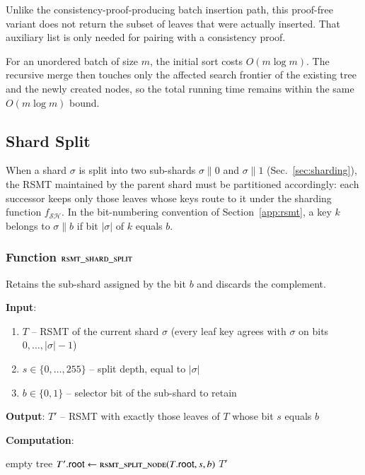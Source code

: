 Unlike the consistency-proof-producing batch insertion path, this proof-free variant does not return the subset of leaves that were actually inserted. That auxiliary list is only needed for pairing with a consistency proof.

For an unordered batch of size $m$, the initial sort costs $O(m \log m)$. The recursive merge then touches only the affected search frontier of the existing tree and the newly created nodes, so the total running time remains within the same $O(m \log m)$ bound.


\subsection{Shard Split}\label{sec:rsmt-shard-split}

When a shard $\sigma$ is split into two sub-shards $\sigma \| 0$ and $\sigma \| 1$ (Sec.~\ref{sec:sharding}), the RSMT maintained by the parent shard must be partitioned accordingly: each successor keeps only those leaves whose keys route to it under the sharding function $f_{\mathcal{SH}}$. In the bit-numbering convention of Section~\ref{app:rsmt}, a key $k$ belongs to $\sigma \| b$ if bit $|\sigma|$ of $k$ equals $b$.

\subsubsection{Function $\textsc{rsmt\_shard\_split}$}\label{sec:rsmt-shard-split-fn}

Retains the sub-shard assigned by the bit $b$ and discards the complement.

\textbf{Input}:
\begin{enumerate}
	\item $T$ -- RSMT of the current shard $\sigma$ (every leaf key agrees with $\sigma$ on bits $0, \ldots, |\sigma|-1$)
	\item $s \in \{0, \ldots, 255\}$ -- split depth, equal to $|\sigma|$
	\item $b \in \{0, 1\}$ -- selector bit of the sub-shard to retain
\end{enumerate}

\textbf{Output}: $T'$ -- RSMT with exactly those leaves of $T$ whose bit $s$ equals $b$

\textbf{Computation}:
\begin{algorithmic}
			\State \Return empty tree
		\EndIf
		\State $T'.\mathsf{root} \gets \Call{rsmt\_split\_node}{T.\mathsf{root}, s, b}$
		\State \Return $T'$
	\EndFunction
\end{algorithmic}

